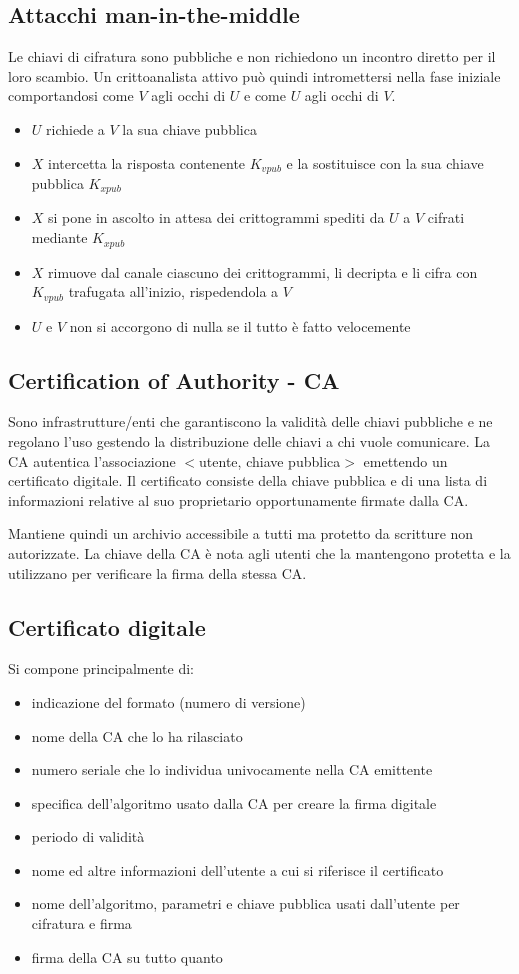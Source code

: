 \subsection{Attacchi man-in-the-middle}
Le chiavi di cifratura sono pubbliche e non richiedono un incontro diretto per il loro scambio.
Un crittoanalista attivo può quindi intromettersi nella fase iniziale comportandosi come $V$ agli occhi di $U$ e come $U$ agli occhi di $V$.
\begin{itemize}
    \item $U$ richiede a $V$ la sua chiave pubblica
    \item $X$ intercetta la risposta contenente $K_{vpub}$ e la sostituisce con la sua chiave pubblica $K_{xpub}$
    \item $X$ si pone in ascolto in attesa dei crittogrammi spediti da $U$ a $V$ cifrati mediante $K_{xpub}$
    \item $X$ rimuove dal canale ciascuno dei crittogrammi, li decripta e li cifra con $K_{vpub}$ trafugata all'inizio, rispedendola a $V$
    \item $U$ e $V$ non si accorgono di nulla se il tutto è fatto velocemente
\end{itemize}

\subsection{Certification of Authority - CA}
Sono infrastrutture/enti che garantiscono la validità delle chiavi pubbliche e ne regolano l'uso gestendo la distribuzione delle chiavi a chi vuole comunicare.
La CA autentica l'associazione $<$utente, chiave pubblica$>$ emettendo un certificato digitale.
Il certificato consiste della chiave pubblica e di una lista di informazioni relative al suo proprietario opportunamente firmate dalla CA.

Mantiene quindi un archivio accessibile a tutti ma protetto da scritture non autorizzate.
La chiave della CA è nota agli utenti che la mantengono protetta e la utilizzano per verificare la firma della stessa CA.

\subsection{Certificato digitale}
Si compone principalmente di:
\begin{itemize}
    \item indicazione del formato (numero di versione)
    \item nome della CA che lo ha rilasciato
    \item numero seriale che lo individua univocamente nella CA emittente
    \item specifica dell'algoritmo usato dalla CA per creare la firma digitale
    \item periodo di validità
    \item nome ed altre informazioni dell'utente a cui si riferisce il certificato
    \item nome dell'algoritmo, parametri e chiave pubblica usati dall'utente per cifratura e firma
    \item firma della CA su tutto quanto
\end{itemize}

